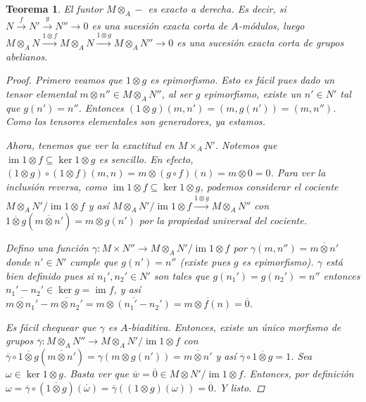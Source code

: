 \documentclass[12pt]{book}
\newtheorem{teo}{Teorema}[section]
\theoremstyle{definition}
\DeclareMathOperator{\im}{im}
\begin{document}
\begin{teo}
El funtor $M\otimes_A -$ es exacto a derecha. Es decir, si $N\stackrel{f}{\longrightarrow} N'\stackrel{g}{\longrightarrow} N''\longrightarrow 0$ es una sucesión exacta corta de $A$-módulos, luego $M\otimes_A N\stackrel{1\otimes f}{\longrightarrow} M\otimes_A N\stackrel{1\otimes g}{\longrightarrow} M\otimes_A N''\longrightarrow 0$ es una sucesión exacta corta de grupos abelianos.
\begin{proof}
Primero veamos que $1\otimes g$ es epimorfismo. Esto es fácil pues dado un tensor elemental $m\otimes n''\in M\otimes_A N''$, al ser $g$ epimorfismo, existe un $n'\in N'$ tal que $g(n')=n''$. Entonces $(1\otimes g)(m,n')=(m,g(n'))=(m,n'')$. Como los tensores elementales son generadores, ya estamos.

Ahora, tenemos que ver la exactitud en $M\times_A N'$. Notemos que $\im 1\otimes f\subseteq \ker 1\otimes g$ es sencillo. En efecto, $(1\otimes g)\circ (1\otimes f)(m,n) = m\otimes (g\circ f)(n) = m\otimes 0 = 0$. Para ver la inclusión reversa, como $\im 1\otimes f\subseteq \ker 1\otimes g$, podemos considerar el cociente $M\otimes_A N'/\im 1\otimes f$ y así $M\otimes_A N'/\im 1\otimes f \stackrel{\overline{1\otimes g}}{\longrightarrow} M\otimes_A N''$ con $\overline{1\otimes g}(\overline{m\otimes n'}) = m\otimes g(n')$ por la propiedad universal del cociente.

Defino una función $\gamma:M\times N''\to M\otimes_A N'/\im 1\otimes f$ por $\gamma(m,n'')=\overline{m\otimes n'}$ donde $n'\in N'$ cumple que $g(n')=n''$ (existe pues $g$ es epimorfismo). $\gamma$ está bien definido pues si $n_1', n_2'\in N'$ son tales que $g(n_1')=g(n_2')=n''$ entonces $n_1'-n_2'\in \ker g = \im f$, y así $\overline{m\otimes n_1'}-\overline{m\otimes n_2'} = \overline{m\otimes (n_1' - n_2')} = \overline{m\otimes f(n)} = \overline{0}$.

Es fácil chequear que $\gamma$ es $A$-biaditiva. Entonces, existe un único morfismo de grupos $\overline{\gamma}:M\otimes_A N''\to M\otimes_A N'/\im 1\otimes f$ con $\overline{\gamma}\circ\overline{1\otimes g}(\overline{m\otimes n'}) = \gamma(m\otimes g(n')) = \overline{m\otimes n'}$ y así $\overline{\gamma}\circ \overline{1\otimes g} = 1$. Sea $\omega\in\ker 1\otimes g$. Basta ver que $\overline{w}=\overline{0}\in M\otimes N'/\im 1\otimes f$. Entonces, por definición $\omega = \overline{\gamma}\circ (\overline{1\otimes g})(\overline{\omega}) = \overline{\gamma}((1\otimes g)(\omega))=\overline{0}$. Y listo.

\end{proof}
\end{teo}
\end{document}
